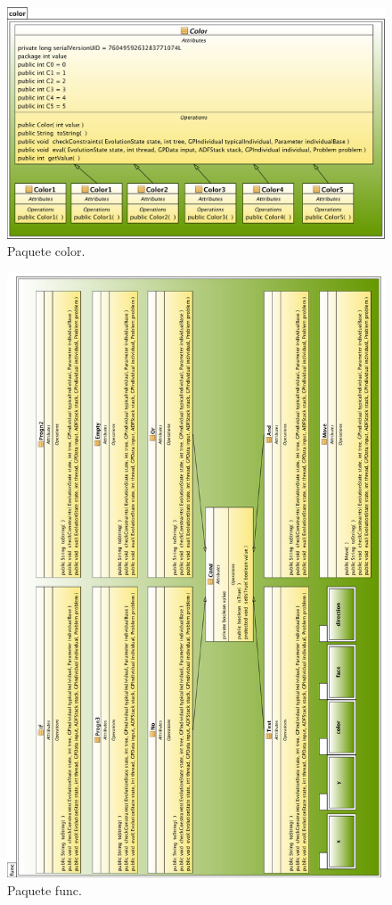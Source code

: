 \begin{figure}[ctb]
\centering
\includegraphics[scale=0.12]{figs/classes/color}
\caption{Paquete color.}
\label{fig:package-color}
\end{figure}

\begin{figure}[cbt]
\centering
\includegraphics[scale=0.09]{figs/classes/func}
\caption{Paquete func.}
\label{fig:package-func}
\end{figure}

